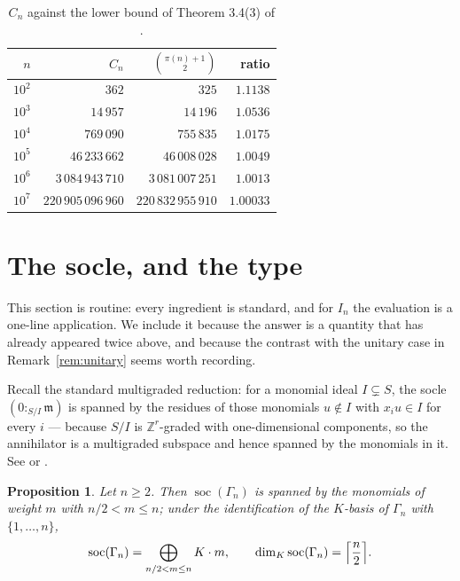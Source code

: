 \documentclass[a4paper,11pt,oneside,reqno]{amsart}
\theoremstyle{definition}
\theoremstyle{remark}
\theoremstyle{plain}
\newtheorem{proposition}[definition]{Proposition}
\newcommand{\ZZ}{\mathbb{Z}}
\newcommand{\Gam}{\Gamma}
\begin{document}
\begin{table}[ht]
  \centering
  \begin{tabular}{rrrr}
    \toprule
    \(n\) & \(C_n\) & \(\binom{\pi(n)+1}{2}\) & ratio \\
    \midrule
    \(10^{2}\) & \(362\) & \(325\) & \(1.1138\) \\
    \(10^{3}\) & \(14\,957\) & \(14\,196\) & \(1.0536\) \\
    \(10^{4}\) & \(769\,090\) & \(755\,835\) & \(1.0175\) \\
    \(10^{5}\) & \(46\,233\,662\) & \(46\,008\,028\) & \(1.0049\) \\
    \(10^{6}\) & \(3\,084\,943\,710\) & \(3\,081\,007\,251\) & \(1.0013\) \\
    \(10^{7}\) & \(220\,905\,096\,960\) & \(220\,832\,955\,910\) & \(1.00033\) \\
    \bottomrule
  \end{tabular}
  \caption{\(C_n\) against the lower bound of Theorem 3.4(3) of
    \cite{Snellman2000}.}\label{tab:err}
\end{table}

\section{The socle, and the type}\label{sec:socle}

This section is routine: every ingredient is standard, and for \(I_n\) the
evaluation is a one-line application. We include it because the answer is a
quantity that has already appeared twice above, and because the contrast with
the unitary case in Remark~\ref{rem:unitary} seems worth recording.

Recall the standard multigraded reduction: for a monomial ideal \(I \subsetneq S\),
the socle \((0:_{S/I}\mathfrak m)\) is spanned by the residues of those
monomials \(u \notin I\) with \(x_iu \in I\) for every \(i\) --- because \(S/I\)
is \(\ZZ^{r}\)-graded with one-dimensional components, so the annihilator is a
multigraded subspace and hence spanned by the monomials in it. See
\cite{HerzogHibi} or \cite{MillerSturmfels}.

\begin{proposition}\label{prop:socle}
  Let \(n \ge 2\). Then \(\operatorname{soc}(\Gam_n)\) is spanned by the
  monomials of weight \(m\) with \(n/2 < m \le n\); under the identification of
  the \(K\)-basis of \(\Gam_n\) with \(\{1,\dots,n\}\),
  \begin{equation}\label{eq:socle}
    \operatorname{soc}(\Gam_n) = \bigoplus_{n/2 < m \le n}K \cdot m,
    \qquad
    \dim_K\operatorname{soc}(\Gam_n) = \Bigl\lceil\frac{n}{2}\Bigr\rceil .
  \end{equation}
\end{proposition}
\end{document}
